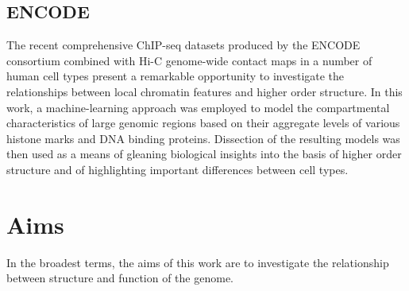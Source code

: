 \documentclass[a4paper,10pt,oneside]{book}
\begin{document}
\subsection{ENCODE}

The recent comprehensive ChIP-seq datasets
produced by the ENCODE consortium\cite{Dunham2012} combined with Hi-C
genome-wide contact maps in a number of human cell
types\cite{Dixon2012, Lieberman2009, Kalhor2012} present a remarkable
opportunity to investigate the relationships between local
chromatin features and higher order structure. In this work, a
machine-learning approach was employed to model the
compartmental characteristics of large genomic regions based on their
aggregate levels of various histone marks and DNA binding
proteins. Dissection of the resulting models was then used as a
means of gleaning biological insights into the basis of higher order
structure and of highlighting important differences between cell types.


\section{Aims}

In the broadest terms, the aims of this work are to investigate the relationship between structure and function of the genome.

\ifstandalone
\begin{small}

\end{small}
\fi
\end{document}
